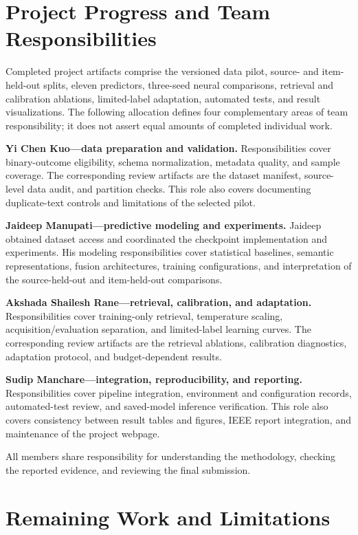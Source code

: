\documentclass[conference]{IEEEtran}
\begin{document}
\section{Project Progress and Team Responsibilities}
\label{sec:progress}
Completed project artifacts comprise the versioned data pilot, source- and item-held-out splits, eleven predictors, three-seed neural comparisons, retrieval and calibration ablations, limited-label adaptation, automated tests, and result visualizations. The following allocation defines four complementary areas of team responsibility; it does not assert equal amounts of completed individual work.

\textbf{Yi Chen Kuo---data preparation and validation.} Responsibilities cover binary-outcome eligibility, schema normalization, metadata quality, and sample coverage. The corresponding review artifacts are the dataset manifest, source-level data audit, and partition checks. This role also covers documenting duplicate-text controls and limitations of the selected pilot.

\textbf{Jaideep Manupati---predictive modeling and experiments.} Jaideep obtained dataset access and coordinated the checkpoint implementation and experiments. His modeling responsibilities cover statistical baselines, semantic representations, fusion architectures, training configurations, and interpretation of the source-held-out and item-held-out comparisons.

\textbf{Akshada Shailesh Rane---retrieval, calibration, and adaptation.} Responsibilities cover training-only retrieval, temperature scaling, acquisition/evaluation separation, and limited-label learning curves. The corresponding review artifacts are the retrieval ablations, calibration diagnostics, adaptation protocol, and budget-dependent results.

\textbf{Sudip Manchare---integration, reproducibility, and reporting.} Responsibilities cover pipeline integration, environment and configuration records, automated-test review, and saved-model inference verification. This role also covers consistency between result tables and figures, IEEE report integration, and maintenance of the project webpage.

All members share responsibility for understanding the methodology, checking the reported evidence, and reviewing the final submission.

\section{Remaining Work and Limitations}
\end{document}
